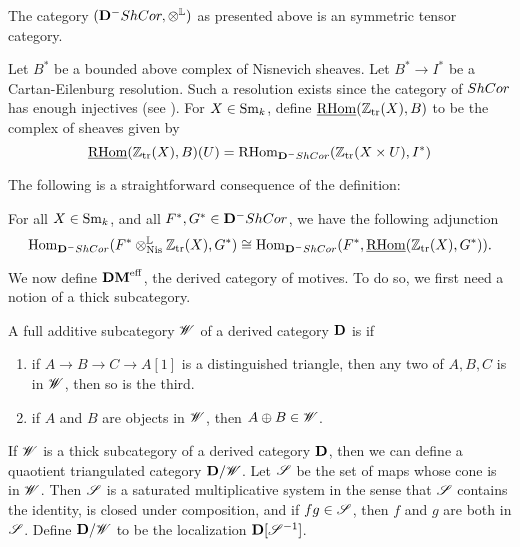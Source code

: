 \begin{thm}\label{thm_dshcor_tensor}
The category $(\DCat^-\ShCor, \tL)$ as presented above is an 
symmetric tensor category.
\end{thm}

\begin{defn}
Let $B^*$ be a bounded above complex of Nisnevich sheaves. Let $B^*
\to I^*$ be a Cartan-Eilenburg resolution. Such a resolution 
exists since the category of $\ShCor$ has enough injectives (see 
\cite[Prop.  6.19]{MVW}). For $X \in \Sm$, define 
$\sheaf{\rhom}(\Ztr(X), B)$ to be the complex of sheaves given by
\[
\sheaf{\rhom}(\Ztr(X), B)(U) = \rhom_{\DCat^-\ShCor}(\Ztr(X \times U),
I^*)
\]
\end{defn}


The following is a straightforward consequence of the definition:

\begin{lem}
For all $X \in \Sm$, and all $F^*, G^* \in \DCat^-\ShCor$, we have
the following adjunction
\[
\hom_{\DCat^-\ShCor}(F^*\tLNis \Ztr(X), G^*) \cong
\hom_{\DCat^-\ShCor}(F^*, \sheaf{\rhom}(\Ztr(X), G^*)).
\]
\end{lem}

We now define $\DMeff$, the derived category of motives. To do so,
we first need a notion of a thick subcategory.

\begin{defn}
A full additive subcategory $\Cat{W}$ of a derived category 
$\DCat$ is  if
\begin{enumerate}
\item if $A \to B \to C \to A[1]$ is a distinguished triangle, then
any two of $A, B, C$ is in $\Cat{W}$, then so is the third.

\item if $A$ and $B$ are objects in $\Cat{W}$, then $A \oplus B \in
\Cat{W}$.
\end{enumerate}
\end{defn}

If $\Cat{W}$ is a thick subcategory of a derived category $\DCat$,
then we can define a quaotient triangulated category 
$\DCat/\Cat{W}$. Let $\Cat{S}$ be the set of maps whose cone is in 
$\Cat{W}$. Then $\Cat{S}$ is a saturated multiplicative system in 
the sense that $\Cat{S}$ contains the identity, is closed under 
composition, and if $fg \in \Cat{S}$, then $f$ and $g$ are both in 
$\Cat{S}$. Define $\DCat/\Cat{W}$ to be the localization 
$\DCat[D] [\Cat{S}^{-1}]$.


